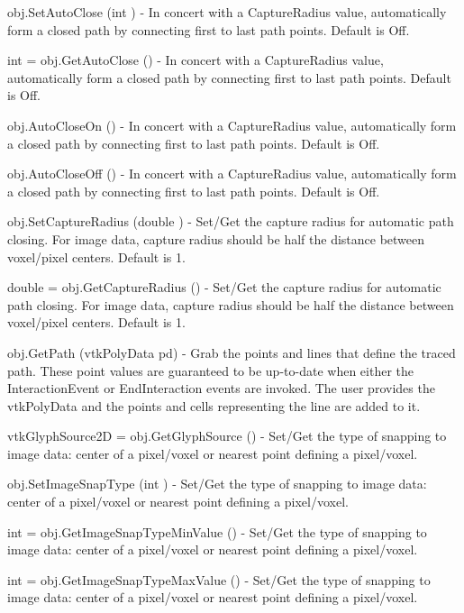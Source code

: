 \begin{DoxyItemize}
\item {\ttfamily obj.\-Set\-Auto\-Close (int )} -\/ In concert with a Capture\-Radius value, automatically form a closed path by connecting first to last path points. Default is Off.  
\item {\ttfamily int = obj.\-Get\-Auto\-Close ()} -\/ In concert with a Capture\-Radius value, automatically form a closed path by connecting first to last path points. Default is Off.  
\item {\ttfamily obj.\-Auto\-Close\-On ()} -\/ In concert with a Capture\-Radius value, automatically form a closed path by connecting first to last path points. Default is Off.  
\item {\ttfamily obj.\-Auto\-Close\-Off ()} -\/ In concert with a Capture\-Radius value, automatically form a closed path by connecting first to last path points. Default is Off.  
\item {\ttfamily obj.\-Set\-Capture\-Radius (double )} -\/ Set/\-Get the capture radius for automatic path closing. For image data, capture radius should be half the distance between voxel/pixel centers. Default is 1.  
\item {\ttfamily double = obj.\-Get\-Capture\-Radius ()} -\/ Set/\-Get the capture radius for automatic path closing. For image data, capture radius should be half the distance between voxel/pixel centers. Default is 1.  
\item {\ttfamily obj.\-Get\-Path (vtk\-Poly\-Data pd)} -\/ Grab the points and lines that define the traced path. These point values are guaranteed to be up-\/to-\/date when either the Interaction\-Event or End\-Interaction events are invoked. The user provides the vtk\-Poly\-Data and the points and cells representing the line are added to it.  
\item {\ttfamily vtk\-Glyph\-Source2\-D = obj.\-Get\-Glyph\-Source ()} -\/ Set/\-Get the type of snapping to image data\-: center of a pixel/voxel or nearest point defining a pixel/voxel.  
\item {\ttfamily obj.\-Set\-Image\-Snap\-Type (int )} -\/ Set/\-Get the type of snapping to image data\-: center of a pixel/voxel or nearest point defining a pixel/voxel.  
\item {\ttfamily int = obj.\-Get\-Image\-Snap\-Type\-Min\-Value ()} -\/ Set/\-Get the type of snapping to image data\-: center of a pixel/voxel or nearest point defining a pixel/voxel.  
\item {\ttfamily int = obj.\-Get\-Image\-Snap\-Type\-Max\-Value ()} -\/ Set/\-Get the type of snapping to image data\-: center of a pixel/voxel or nearest point defining a pixel/voxel.  

\end{DoxyItemize}
